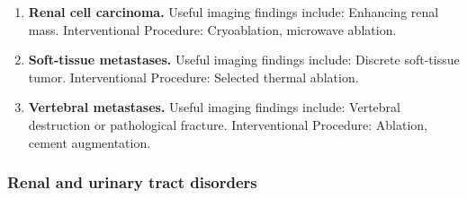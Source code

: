 \begin{enumerate}[leftmargin=*,itemsep=0.45em,topsep=0.4em]
\item \textbf{Renal cell carcinoma.} Useful imaging findings include: Enhancing renal mass. Interventional Procedure: Cryoablation, microwave ablation.
\item \textbf{Soft-tissue metastases.} Useful imaging findings include: Discrete soft-tissue tumor. Interventional Procedure: Selected thermal ablation.
\item \textbf{Vertebral metastases.} Useful imaging findings include: Vertebral destruction or pathological fracture. Interventional Procedure: Ablation, cement augmentation.
\end{enumerate}

\subsubsection{Renal and urinary tract disorders}
